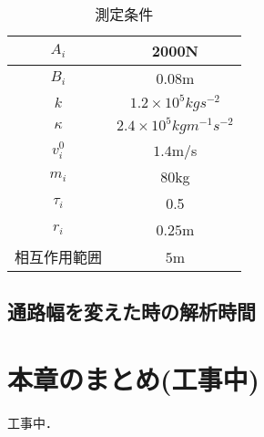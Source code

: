 \begin{table}[tb]
  \begin{center}
    \caption{測定条件}
    \label{tb:result_para}
    \begin{tabular}{c|c}
      \hline \hline
      $A_i$            & 2000N                              \\ \hline 
      $B_i$            & 0.08m                              \\ \hline 
      $k$              & $1.2 \times 10^5 kg s^{-2} $       \\ \hline 
      $\kappa$         & $2.4 \times 10^5 kg m^{-1} s^{-2}$ \\ \hline 
      $v_i^0$          & $1.4$m/s                           \\ \hline 
      $m_i$            & $80$kg                             \\ \hline 
      $\tau_i$         & 0.5                               \\ \hline 
      $r_i$            & $0.25$m                            \\ \hline 
      相互作用範囲     & $5$m                              \\ \hline 
    \end{tabular}
  \end{center}
\end{table}



\subsection{通路幅を変えた時の解析時間}



\section{本章のまとめ(工事中)}
工事中．

